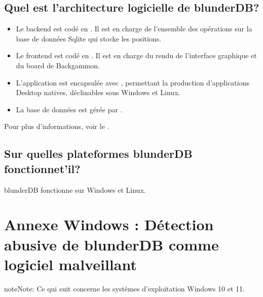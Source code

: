 \documentclass[letterpaper,10pt,french]{sphinxmanual}
\begin{document}
\subsection{Quel est l’architecture logicielle de blunderDB?}
\label{\detokenize{faq:quel-est-l-architecture-logicielle-de-blunderdb}}\begin{itemize}
\item {} 
\sphinxAtStartPar
Le backend est codé en . Il est en charge de
l’ensemble des opérations sur la base de données Sqlite qui stocke les
positions.

\item {} 
\sphinxAtStartPar
Le frontend est codé en . Il est en charge du
rendu de l’interface graphique et du board de Backgammon.

\item {} 
\sphinxAtStartPar
L’application est encapsulée avec , permettant la
production d’applications Desktop natives, déclinables sous Windows et Linux.

\item {} 
\sphinxAtStartPar
La base de données est gérée par .

\end{itemize}

\sphinxAtStartPar
Pour plus d’informations, voir le .


\subsection{Sur quelles plateformes blunderDB fonctionne\sphinxhyphen{}t’il?}
\label{\detokenize{faq:sur-quelles-plateformes-blunderdb-fonctionne-t-il}}
\sphinxAtStartPar
blunderDB fonctionne sur Windows et Linux.

\sphinxstepscope


\section{Annexe Windows : Détection abusive de blunderDB comme logiciel malveillant}
\label{\detokenize{annexe_windows_securite:annexe-windows-detection-abusive-de-blunderdb-comme-logiciel-malveillant}}\label{\detokenize{annexe_windows_securite:annexe-windows-malware}}\label{\detokenize{annexe_windows_securite::doc}}
\begin{sphinxadmonition}{note}{Note:}
\sphinxAtStartPar
Ce qui suit concerne les systèmes d’exploitation Windows 10 et 11.
\end{sphinxadmonition}
\end{document}
